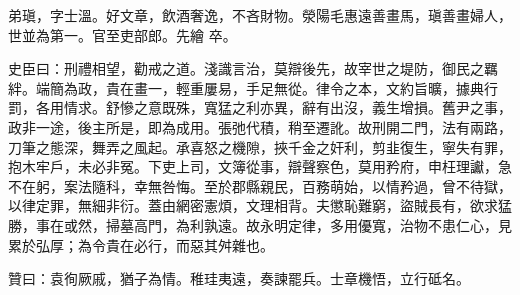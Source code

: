 \begin{pinyinscope}
 弟瑱，字士溫。好文章，飲酒奢逸，不吝財物。滎陽毛惠遠善畫馬，瑱善畫婦人，世並為第一。官至吏部郎。先繪
 卒。



 史臣曰：刑禮相望，勸戒之道。淺識言治，莫辯後先，故宰世之堤防，御民之羈絆。端簡為政，貴在畫一，輕重屢易，手足無從。律令之本，文約旨曠，據典行罰，各用情求。舒慘之意既殊，寬猛之利亦異，辭有出沒，義生增損。舊尹之事，政非一途，後主所是，即為成用。張弛代積，稍至遷訛。故刑開二門，法有兩路，刀筆之態深，舞弄之風起。承喜怒之機隙，挾千金之奸利，剪韭復生，寧失有罪，抱木牢戶，未必非冤。下吏上司，文簿從事，辯聲察色，莫用矜府，申枉理讞，急不在躬，案法隨科，幸無咎悔。至於郡縣親民，百務萌始，以情矜過，曾不待獄，以律定罪，無細非衍。蓋由網密憲煩，文理相背。夫懲恥難窮，盜賊長有，欲求猛勝，事在或然，掃墓高門，為利孰遠。故永明定律，多用優寬，治物不患仁心，見累於弘厚；為令貴在必行，而惡其舛雜也。



 贊曰：袁徇厥戚，猶子為情。稚珪夷遠，奏諫罷兵。士章機悟，立行砥名。



\end{pinyinscope}